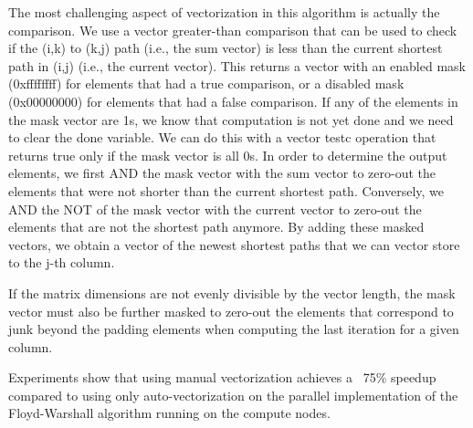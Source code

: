 The most challenging aspect of vectorization in this algorithm is
actually the comparison. We use a vector greater-than comparison that can
be used to check if the (i,k) to (k,j) path (i.e., the sum vector) is
less than the current shortest path in (i,j) (i.e., the current
vector). This returns a vector with an enabled mask (0xffffffff) for
elements that had a true comparison, or a disabled mask (0x00000000) for
elements that had a false comparison. If any of the elements in the mask
vector are 1s, we know that computation is not yet done and we need to
clear the done variable. We can do this with a vector testc operation
that returns true only if the mask vector is all 0s. In order to
determine the output elements, we first AND the mask vector with the sum
vector to zero-out the elements that were not shorter than the current
shortest path. Conversely, we AND the NOT of the mask vector with the
current vector to zero-out the elements that are not the shortest path
anymore. By adding these masked vectors, we obtain a vector of the newest
shortest paths that we can vector store to the j-th column.

If the matrix dimensions are not evenly divisible by the vector length,
the mask vector must also be further masked to zero-out the elements that
correspond to junk beyond the padding elements when computing the last
iteration for a given column.

Experiments show that using manual vectorization achieves a ~75\% speedup
compared to using only auto-vectorization on the parallel implementation
of the Floyd-Warshall algorithm running on the compute nodes.
